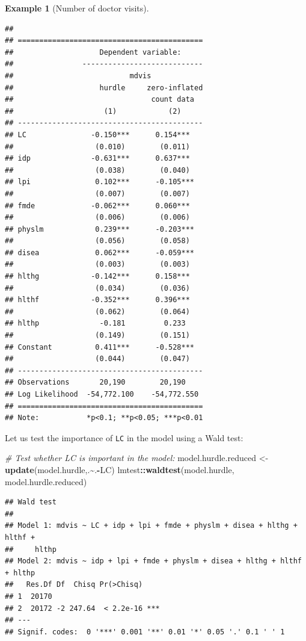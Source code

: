\documentclass[
  12pt,
]{book}
\newenvironment{Shaded}{\begin{snugshade}}{\end{snugshade}}
\newcommand{\CommentTok}[1]{\textcolor[rgb]{0.56,0.35,0.01}{\textit{#1}}}
\newcommand{\FunctionTok}[1]{\textcolor[rgb]{0.13,0.29,0.53}{\textbf{#1}}}
\newcommand{\NormalTok}[1]{#1}
\newcommand{\OtherTok}[1]{\textcolor[rgb]{0.56,0.35,0.01}{#1}}
\newcommand{\SpecialCharTok}[1]{\textcolor[rgb]{0.81,0.36,0.00}{\textbf{#1}}}
\theoremstyle{definition}
\theoremstyle{definition}
\newtheorem{example}{Example}[chapter]
\theoremstyle{definition}
\theoremstyle{definition}
\theoremstyle{remark}
\begin{document}
\begin{example}[Number of doctor visits]
\begin{verbatim}
## 
## ===========================================
##                    Dependent variable:     
##                ----------------------------
##                           mdvis            
##                    hurdle     zero-inflated
##                                count data  
##                     (1)            (2)     
## -------------------------------------------
## LC               -0.150***      0.154***   
##                   (0.010)        (0.011)   
## idp              -0.631***      0.637***   
##                   (0.038)        (0.040)   
## lpi               0.102***      -0.105***  
##                   (0.007)        (0.007)   
## fmde             -0.062***      0.060***   
##                   (0.006)        (0.006)   
## physlm            0.239***      -0.203***  
##                   (0.056)        (0.058)   
## disea             0.062***      -0.059***  
##                   (0.003)        (0.003)   
## hlthg            -0.142***      0.158***   
##                   (0.034)        (0.036)   
## hlthf            -0.352***      0.396***   
##                   (0.062)        (0.064)   
## hlthp              -0.181         0.233    
##                   (0.149)        (0.151)   
## Constant          0.411***      -0.528***  
##                   (0.044)        (0.047)   
## -------------------------------------------
## Observations       20,190        20,190    
## Log Likelihood  -54,772.100    -54,772.550 
## ===========================================
## Note:           *p<0.1; **p<0.05; ***p<0.01
\end{verbatim}

Let us test the importance of \texttt{LC} in the model using a Wald test:

\begin{Shaded}
\begin{Highlighting}[]
\CommentTok{\# Test whether LC is important in the model:}
\NormalTok{model.hurdle.reduced }\OtherTok{\textless{}{-}} \FunctionTok{update}\NormalTok{(model.hurdle,.}\SpecialCharTok{\textasciitilde{}}\NormalTok{.}\SpecialCharTok{{-}}\NormalTok{LC)}
\NormalTok{lmtest}\SpecialCharTok{::}\FunctionTok{waldtest}\NormalTok{(model.hurdle, model.hurdle.reduced)}
\end{Highlighting}
\end{Shaded}

\begin{verbatim}
## Wald test
## 
## Model 1: mdvis ~ LC + idp + lpi + fmde + physlm + disea + hlthg + hlthf + 
##     hlthp
## Model 2: mdvis ~ idp + lpi + fmde + physlm + disea + hlthg + hlthf + hlthp
##   Res.Df Df  Chisq Pr(>Chisq)    
## 1  20170                         
## 2  20172 -2 247.64  < 2.2e-16 ***
## ---
## Signif. codes:  0 '***' 0.001 '**' 0.01 '*' 0.05 '.' 0.1 ' ' 1
\end{verbatim}


\end{example}
\end{document}
